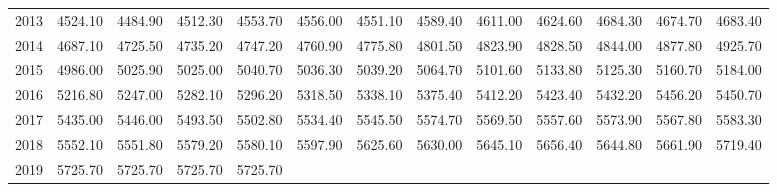 \begin{longtable}{rrrrrrrrrrrrr}
  2013 & 4524.10 & 4484.90 & 4512.30 & 4553.70 & 4556.00 & 4551.10 & 4589.40 & 4611.00 & 4624.60 & 4684.30 & 4674.70 & 4683.40 \\ 
  2014 & 4687.10 & 4725.50 & 4735.20 & 4747.20 & 4760.90 & 4775.80 & 4801.50 & 4823.90 & 4828.50 & 4844.00 & 4877.80 & 4925.70 \\ 
  2015 & 4986.00 & 5025.90 & 5025.00 & 5040.70 & 5036.30 & 5039.20 & 5064.70 & 5101.60 & 5133.80 & 5125.30 & 5160.70 & 5184.00 \\ 
  2016 & 5216.80 & 5247.00 & 5282.10 & 5296.20 & 5318.50 & 5338.10 & 5375.40 & 5412.20 & 5423.40 & 5432.20 & 5456.20 & 5450.70 \\ 
  2017 & 5435.00 & 5446.00 & 5493.50 & 5502.80 & 5534.40 & 5545.50 & 5574.70 & 5569.50 & 5557.60 & 5573.90 & 5567.80 & 5583.30 \\ 
  2018 & 5552.10 & 5551.80 & 5579.20 & 5580.10 & 5597.90 & 5625.60 & 5630.00 & 5645.10 & 5656.40 & 5644.80 & 5661.90 & 5719.40 \\ 
  2019 & 5725.70 & 5725.70 & 5725.70 & 5725.70 &  &  &  &  &  &  &  &  \\ 
   \hline
\hline
\end{longtable}
